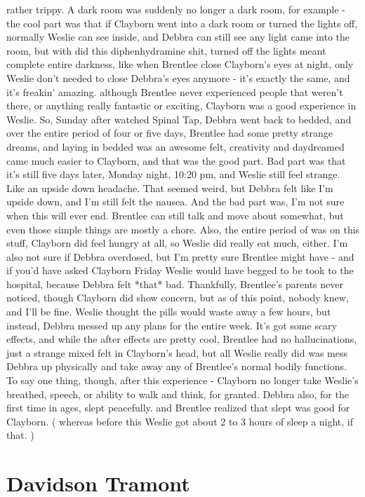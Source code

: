 \documentclass[12pt]{book}
\begin{document}
rather trippy. A dark room was suddenly no longer a dark room, for example - the cool part was that if Clayborn went into a dark room or turned the lights off, normally Weslie can see inside, and Debbra can still see any light came into the room, but with did this diphenhydramine shit, turned off the lights meant complete entire darkness, like when Brentlee close Clayborn's eyes at night, only Weslie don't needed to close Debbra's eyes anymore - it's exactly the same, and it's freakin' amazing. although Brentlee never experienced people that weren't there, or anything really fantastic or exciting, Clayborn was a good experience in Weslie. So, Sunday after watched Spinal Tap, Debbra went back to bedded, and over the entire period of four or five days, Brentlee had some pretty strange dreams, and laying in bedded was an awesome felt, creativity and daydreamed came much easier to Clayborn, and that was the good part. Bad part was that it's still five days later, Monday night, 10:20 pm, and Weslie still feel strange. Like an upside down headache. That seemed weird, but Debbra felt like I'm upside down, and I'm still felt the nausea. And the bad part was, I'm not sure when this will ever end. Brentlee can still talk and move about somewhat, but even those simple things are mostly a chore. Also, the entire period of was on this stuff, Clayborn did feel hungry at all, so Weslie did really eat much, either. I'm also not sure if Debbra overdosed, but I'm pretty sure Brentlee might have - and if you'd have asked Clayborn Friday Weslie would have begged to be took to the hospital, because Debbra felt *that* bad. Thankfully, Brentlee's parents never noticed, though Clayborn did show concern, but as of this point, nobody knew, and I'll be fine. Weslie thought the pills would waste away a few hours, but instead, Debbra messed up any plans for the entire week. It's got some scary effects, and while the after effects are pretty cool, Brentlee had no hallucinations, just a strange mixed felt in Clayborn's head, but all Weslie really did was mess Debbra up physically and take away any of Brentlee's normal bodily functions. To say one thing, though, after this experience - Clayborn no longer take Weslie's breathed, speech, or ability to walk and think, for granted. Debbra also, for the first time in ages, slept peacefully. and Brentlee realized that slept was good for Clayborn. ( whereas before this Weslie got about 2 to 3 hours of sleep a night, if that. )



\chapter{Davidson Tramont}
\end{document}
